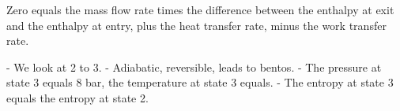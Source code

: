 Zero equals the mass flow rate times the difference between the enthalpy at exit and the enthalpy at entry, plus the heat transfer rate, minus the work transfer rate.

- We look at 2 to 3.
- Adiabatic, reversible, leads to bentos.
- The pressure at state 3 equals 8 bar, the temperature at state 3 equals.
- The entropy at state 3 equals the entropy at state 2.